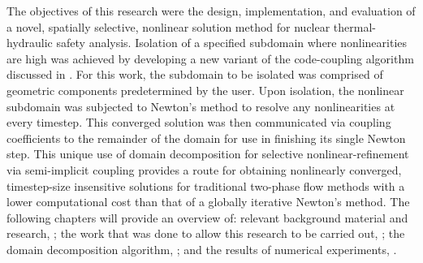 The objectives of this research were the design, implementation, and evaluation of a novel, spatially selective, nonlinear solution method for nuclear thermal-hydraulic safety analysis.
Isolation of a specified subdomain where nonlinearities are high was achieved by developing a new variant of the code-coupling algorithm discussed in .
For this work, the subdomain to be isolated was comprised of geometric components predetermined by the user.
Upon isolation, the nonlinear subdomain was subjected to Newton's method to resolve any nonlinearities at every timestep.
This converged solution was then communicated via coupling coefficients to the remainder of the domain for use in finishing its single Newton step.
This unique use of domain decomposition for selective nonlinear-refinement via semi-implicit coupling provides a route for obtaining nonlinearly converged, timestep-size insensitive solutions for traditional two-phase flow methods with a lower computational cost than that of a globally iterative Newton's method.
The following chapters will provide an overview of: relevant background material and research, ; the work that was done to allow this research to be carried out, ; the domain decomposition algorithm, ; and the results of numerical experiments, .
